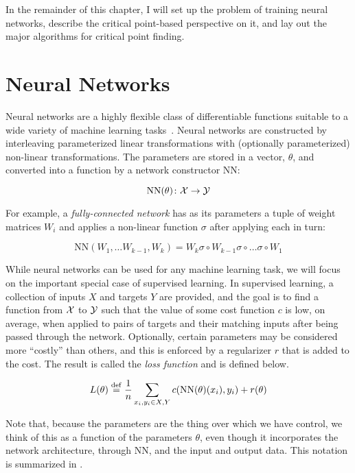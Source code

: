 \documentclass[../../thesis.tex]{subfiles}
\begin{document}
In the remainder of this chapter,
I will set up the problem of training neural networks,
describe the critical point-based perspective on it,
and lay out the major algorithms for critical point finding.

\section{Neural Networks}

Neural networks are a highly flexible class of
differentiable functions
suitable to a wide variety of
machine learning tasks~\cite{lecun2015}.
Neural networks are constructed by interleaving
parameterized linear transformations
with (optionally parameterized) non-linear transformations.
The parameters are stored in a vector, $\theta$,
and converted into a function by a network constructor $\mathrm{NN}$:

\begin{equation}
	\mathrm{NN}(\theta) \colon {\mathcal{X}} \to {\mathcal{Y}}
\end{equation}

For example,
a \emph{fully-connected network}
has as its parameters a tuple of weight matrices $W_i$
and applies a non-linear function $\sigma$
after applying each in turn:

\begin{equation}
	\mathrm{NN}\left(W_1, \dots W_{k-1}, W_k\right) = W_k \sigma \circ W_{k-1} \sigma \circ \dots \sigma \circ W_1
\end{equation}

While neural networks can be used for any machine learning task,
we will focus on the important special case of supervised learning.
In supervised learning, a collection of inputs $X$ and targets $Y$
are provided, and the goal is to find a function from ${\mathcal{X}}$ to ${\mathcal{Y}}$
such that the value of some cost function $c$ is low, on average, when applied to
pairs of targets and their matching inputs after being passed through the network.
Optionally, certain parameters may be considered more \enquote{costly}
than others, and this is enforced by a regularizer $r$
that is added to the cost.
The result is called the \emph{loss function}
and is defined below.

\begin{equation}\equationlabel{loss-def}
	L(\theta) \defeq \frac{1}{n}\sum_{x_i, y_i \in X, Y} c(\mathrm{NN}(\theta)(x_i), y_i) + r(\theta)
\end{equation}

Note that,
because the parameters are the thing over which we have control,
we think of this as a function of the parameters $\theta$,
even though it incorporates the network architecture,
through $\mathrm{NN}$,
and the input and output data.
This notation is summarized in .
\end{document}
